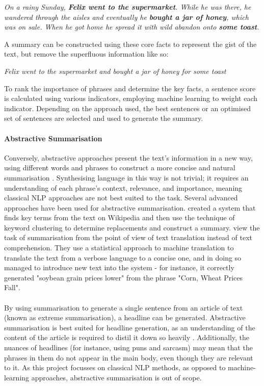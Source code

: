 \textit{On a rainy Sunday, \textbf{Felix went to the supermarket}. While he was there, he wandered through the aisles and eventually he \textbf{bought a jar of honey}, which was on sale. When he got home he spread it with wild abandon onto \textbf{some toast}.}

A summary can be constructed using these core facts to represent the gist of the text, but remove the superfluous information like so:

\textit{Felix went to the supermarket and bought a jar of honey for some toast}

To rank the importance of phrases and determine the key facts, a sentence score is calculated using various indicators, employing machine learning to weight each indicator. Depending on the approach used, the best sentences or an optimised set of sentences are selected and used to generate the summary.

\paragraph{Abstractive Summarisation}
Conversely, abstractive approaches present the text's information in a new way, using different words and phrases to construct a more concise and natural summarisation \cite{allahyari2017}. Synthesising language in this way is not trivial; it requires an understanding of each phrase's context, relevance, and importance, meaning classical NLP approaches are not best suited to the task. Several advanced approaches have been used for abstractive summarisation. \citeauthor{xu2010} created a system that finds key terms from the text on Wikipedia and then use the technique of keyword clustering to determine replacements and construct a summary. \citeauthor{banko2000} view the task of summarisation from the point of view of text translation instead of text comprehension. They use a statistical approach to machine translation to translate the text from a verbose language to a concise one, and in doing so managed to introduce new text into the system - for instance, it correctly generated "soybean grain prices lower" from the phrase "Corn, Wheat Prices Fall".

\paragraph{}
By using summarisation to generate a single sentence from an article of text (known as extreme summarisation), a headline can be generated. Abstractive summarisation is best suited for headline generation, as an understanding of the content of the article is required to distil it down so heavily \cite{hayashi2018}. Additionally, the nuances of headlines (for instance, using puns and sarcasm) may mean that the phrases in them do not appear in the main body, even though they are relevant to it. As this project focusses on classical NLP methods, as opposed to machine-learning approaches, abstractive summarisation is out of scope.